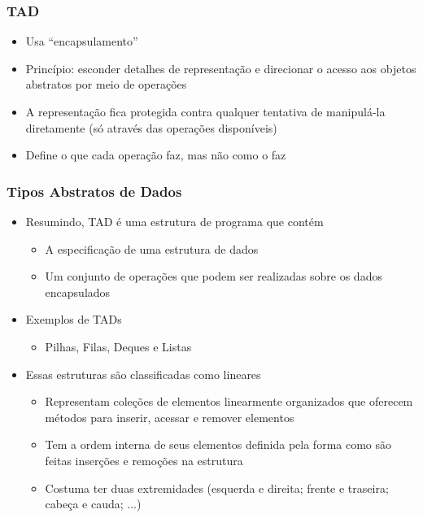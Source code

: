 \documentclass[aspectratio=169]{beamer}
\begin{document}
\begin{frame}\frametitle{TAD}
\begin{itemize}
	\item Usa ``encapsulamento''
	\item Princípio: esconder detalhes de representação e direcionar o acesso aos objetos abstratos por meio de operações
	\item A representação fica protegida contra qualquer tentativa de manipulá-la diretamente (só através das operações disponíveis)
	\item Define o que cada operação faz, mas não como o faz
\end{itemize}
\end{frame}

\begin{frame}\frametitle{Tipos Abstratos de Dados}
\begin{itemize}
	\item Resumindo, TAD é uma estrutura de programa que contém
	\begin{itemize}
		\item A especificação de uma estrutura de dados
		\item Um conjunto de operações que podem ser realizadas sobre os dados encapsulados
	\end{itemize}
	\item Exemplos de TADs
	\begin{itemize}
		\item Pilhas, Filas, Deques e Listas
	\end{itemize}
	\item Essas estruturas são classificadas como lineares
	\begin{itemize}
		\item Representam coleções de elementos linearmente organizados que oferecem métodos para inserir, acessar e remover elementos
		\item Tem a ordem interna de seus elementos definida pela forma como são feitas inserções e remoções na estrutura
		\item Costuma ter duas extremidades (esquerda e direita; frente e traseira; cabeça e cauda; ...)
	\end{itemize}
\end{itemize}
\end{frame}
\end{document}
